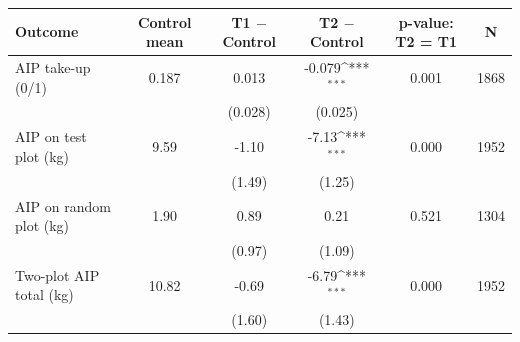 {
\def\sym#1{\ifmmode^{#1}\else\(^{#1}\)\fi}
\begin{tabular}{lccccc}
\hline\hline
Outcome & Control mean & T1 $-$ Control & T2 $-$ Control & p-value: T2 = T1 & N \\
\hline
AIP take-up (0/1) & 0.187 & 0.013 & -0.079\sym{***} & 0.001 & 1868 \\
& & (0.028) & (0.025) & & \\
\addlinespace[6pt]
AIP on test plot (kg) & 9.59 & -1.10 & -7.13\sym{***} & 0.000 & 1952 \\
& & (1.49) & (1.25) & & \\
\addlinespace[6pt]
AIP on random plot (kg) & 1.90 & 0.89 & 0.21 & 0.521 & 1304 \\
& & (0.97) & (1.09) & & \\
\addlinespace[6pt]
Two-plot AIP total (kg) & 10.82 & -0.69 & -6.79\sym{***} & 0.000 & 1952 \\
& & (1.60) & (1.43) & & \\
\hline\hline
\end{tabular}
}
